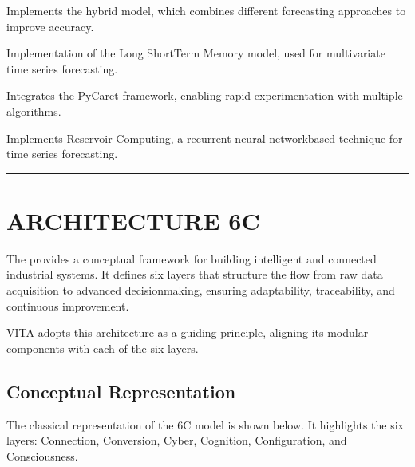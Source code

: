 \documentclass[letterpaper,10pt,english]{sphinxmanual}
\begin{document}
\sphinxAtStartPar
{} \textendash{} Implements the hybrid model, which combines different forecasting approaches to improve accuracy.

\sphinxAtStartPar
{} \textendash{} Implementation of the Long Short\sphinxhyphen{}Term Memory model, used for multivariate time series forecasting.

\sphinxAtStartPar
{} \textendash{} Integrates the PyCaret framework, enabling rapid experimentation with multiple algorithms.

\sphinxAtStartPar
{} \textendash{} Implements Reservoir Computing, a recurrent neural network\sphinxhyphen{}based technique for time series forecasting.


\bigskip\hrule\bigskip



\subsection{}
\label{\detokenize{algorithms:module-documentation}}
\sphinxAtStartPar
{}

\sphinxAtStartPar
{}

\sphinxAtStartPar
{}

\sphinxAtStartPar
{}

\sphinxAtStartPar
{}

\sphinxstepscope


\section{ARCHITECTURE 6C}
\label{\detokenize{architecture6c:architecture-6c}}\label{\detokenize{architecture6c::doc}}
\sphinxAtStartPar
The  provides a conceptual framework for building intelligent and connected
industrial systems. It defines six layers that structure the flow from raw data acquisition
to advanced decision\sphinxhyphen{}making, ensuring adaptability, traceability, and continuous improvement.

\sphinxAtStartPar
VITA adopts this architecture as a guiding principle, aligning its modular components with each of the six layers.


\subsection{Conceptual Representation}
\label{\detokenize{architecture6c:conceptual-representation}}
\sphinxAtStartPar
The classical representation of the 6C model is shown below. It highlights the six layers:
Connection, Conversion, Cyber, Cognition, Configuration, and Consciousness.
\end{document}

